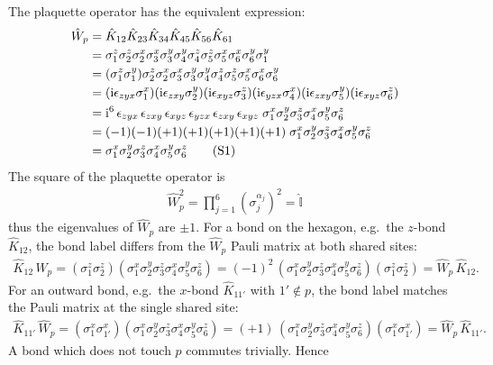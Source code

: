 \documentclass[
  aps,
  prl,
  preprint,
  amsmath,
  amssymb,
  superscriptaddress,
  floatfix
]{revtex4-2}
\newcommand{\ii}{\mathrm{i}}
\newcommand{\oK}{\hat{K}}
\newcommand{\oI}{\hat{\mathbb{I}}}
\newcommand{\numberthis}{\refstepcounter{equation}\tag{\theequation}}
\renewcommand{\theequation}{S\arabic{equation}}
\begin{document}
The plaquette operator has the equivalent expression:
\begin{align*}
    \hat W_p &= \oK_{12} \oK_{23} \oK_{34} \oK_{45} \oK_{56}\oK_{61} \\
    &= \sigma_1^z \sigma_2^z \sigma_2^x \sigma_3^x \sigma_3^y \sigma_4^y \sigma_4^z \sigma_5^z \sigma_5^x \sigma_6^x \sigma_6^y \sigma_1^y \\
    &= (\sigma_1^z \sigma_1^y) \sigma_2^z \sigma_2^x \sigma_3^x \sigma_3^y \sigma_4^y \sigma_4^z \sigma_5^z \sigma_5^x \sigma_6^x \sigma_6^y \\
    &= (\ii \epsilon_{zyx} \sigma_1^x)(\ii \epsilon_{zxy} \sigma_2^y)(\ii \epsilon_{xyz} \sigma_3^z)(\ii \epsilon_{yzx} \sigma_4^x)(\ii \epsilon_{zxy} \sigma_5^y)(\ii \epsilon_{xyz} \sigma_6^z)\\
    &= \ii^6\,\epsilon_{zyx}\,\epsilon_{zxy}\,\epsilon_{xyz}\,\epsilon_{yzx}\,\epsilon_{zxy}\,\epsilon_{xyz}\;
       \sigma_1^x\sigma_2^y\sigma_3^z\sigma_4^x\sigma_5^y\sigma_6^z \\
    &= (-1)(-1)(+1)(+1)(+1)(+1)(+1)\;\sigma_1^x\sigma_2^y\sigma_3^z\sigma_4^x\sigma_5^y\sigma_6^z \\
    &= \sigma_1^x \sigma_2^y \sigma_3^z \sigma_4^x \sigma_5^y \sigma_6^z \numberthis
\end{align*}
The square of the plaquette operator is 
\begin{align*}
  \hat{W}_p^2 = \prod_{j=1}^{6} (\sigma_{j}^{\alpha_j})^2 = \oI
\end{align*}
thus the eigenvalues of $\hat{W}_p$ are $\pm 1$. For a bond on the hexagon,
e.g.\ the $z$-bond $\oK_{12}$, the bond label differs from the $\hat W_p$
Pauli matrix at both shared sites:
\begin{align*}
  \oK_{12}\, \hat W_p
  = (\sigma_1^z \sigma_2^z)(\sigma_1^x \sigma_2^y \sigma_3^z \sigma_4^x \sigma_5^y \sigma_6^z)
  = (-1)^2\, (\sigma_1^x \sigma_2^y \sigma_3^z \sigma_4^x \sigma_5^y \sigma_6^z)(\sigma_1^z \sigma_2^z)
  = \hat W_p\, \oK_{12}.
\end{align*}
For an outward bond, e.g.\ the $x$-bond $\oK_{11'}$ with $1' \notin p$, the
bond label matches the Pauli matrix at the single shared site:
\begin{align*}
  \oK_{11'}\, \hat W_p
  = (\sigma_1^x \sigma_{1'}^x)(\sigma_1^x \sigma_2^y \sigma_3^z \sigma_4^x \sigma_5^y \sigma_6^z)
  = (+1)\, (\sigma_1^x \sigma_2^y \sigma_3^z \sigma_4^x \sigma_5^y \sigma_6^z)(\sigma_1^x \sigma_{1'}^x)
  = \hat W_p\, \oK_{11'}.
\end{align*}
A bond which does not touch $p$ commutes trivially. Hence
\end{document}

